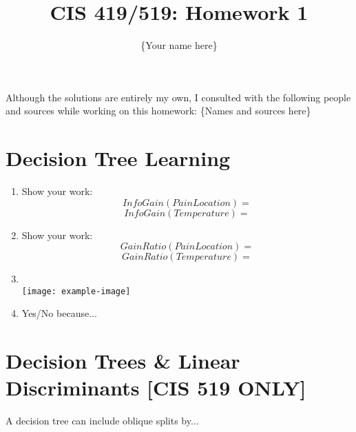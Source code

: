 \documentclass{article}
\title{CIS 419/519: Homework 1}
\author{\{Your name here\}}
\date{}
\begin{document}
    \maketitle
    Although the solutions are entirely my own, I consulted with the following people and sources while working on this homework: \{Names and sources here\}
    
    \section{Decision Tree Learning}
        \begin{enumerate}[label=\alph*.]
            \item %
            Show your work:
            \begin{equation*}
                \mathit{InfoGain}(\mathit{PainLocation}) =
            \end{equation*}
            \begin{equation*}
                \mathit{InfoGain}(\mathit{Temperature}) =
            \end{equation*}
            
            \item %
            Show your work:
            \begin{equation*}
                \mathit{GainRatio}(\mathit{PainLocation}) =
            \end{equation*}
            \begin{equation*}
                \mathit{GainRatio}(\mathit{Temperature}) =
            \end{equation*}
            
            \item %
            ~\\
            
            \texttt{[image: example-image]}
                        
            \item %
            Yes/No because...
        \end{enumerate}
        
       \section{Decision Trees \& Linear Discriminants [CIS 519 ONLY]}
        
        A decision tree can include oblique splits by...
        
\end{document}

